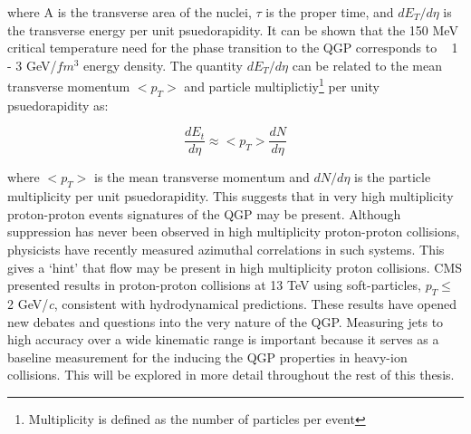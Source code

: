 \noindent
where A is the transverse area of the nuclei, $\tau$ is the proper time, and $dE_{T}/d \eta$ is the transverse energy per unit psuedorapidity.  It can be shown that  the 150 MeV critical temperature need for the phase transition to the QGP corresponds to ~ 1 - 3 GeV/$fm^{3}$ energy density.  The quantity $dE_{T}/d \eta$ can be related to the mean transverse momentum $<p_{T}>$ and particle multiplictiy\footnote{Multiplicity is defined as the number of particles per event} per unity psuedorapidity as:

\begin{equation}
\frac{dE_{t}}{d \eta}  \approx  <p_{T}> \frac{dN}{d\eta}
\label{eq:Et}
\end{equation}

where $ <p_{T} >$ is the mean transverse momentum and $dN/d\eta$ is the particle multiplicity per unit psuedorapidity.  This suggests that in very high multiplicity proton-proton events signatures of the QGP may be present.  Although suppression has never been observed in high multiplicity proton-proton collisions, physicists have recently measured azimuthal correlations in such systems\cite{Nagle:2018nvi}.  This gives a `hint' that flow may be present in high multiplicity proton collisions.  CMS presented results in proton-proton collisions at 13 TeV using soft-particles, $p_{T} \leq\,$ 2 GeV/\textit{c}, consistent with hydrodynamical predictions\cite{ZHAO2018495}. These results have opened new debates and questions into the very nature of the QGP.  Measuring jets to high accuracy over a wide kinematic range is important because it serves as a baseline measurement for the inducing the QGP properties in heavy-ion collisions.  This will be explored in more detail throughout the rest of this thesis.